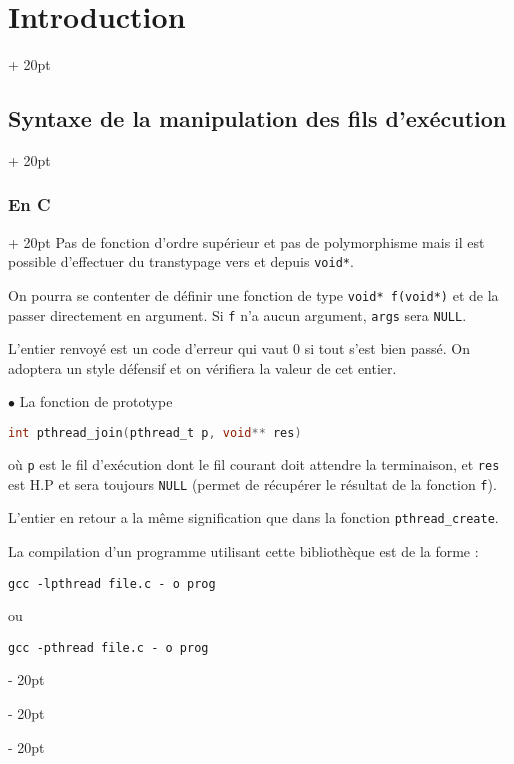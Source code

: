 \documentclass[a4paper, 12pt, twoside]{article}
\newcommand{\ind}[1][20pt]{\advance\leftskip + #1}
\newcommand{\deind}[1][20pt]{\advance\leftskip - #1}
\newenvironment{indt}[2][20pt]{#2 \par \ind[#1]}{\par \deind} %
\begin{document}
\begin{indt}{\section{Introduction}}
\begin{indt}{\subsection{Syntaxe de la manipulation des fils d'exécution}}
\begin{indt}{\subsubsection{En C}}
                Pas de fonction d'ordre supérieur et pas de polymorphisme mais il est possible d'effectuer du transtypage vers et depuis \texttt{void*}.

                On pourra se contenter de définir une fonction de type \texttt{void* f(void*)} et de la passer directement en argument.
                Si \texttt f n'a aucun argument, \texttt{args} sera \texttt{NULL}.

                L'entier renvoyé est un code d'erreur qui vaut 0 si tout s'est bien passé. On adoptera un style défensif et on vérifiera la valeur de cet entier.

                \vspace{12pt}
                
                $\bullet$ La fonction de prototype

                \begin{lstlisting}[language=C, xleftmargin=80pt]
int pthread_join(pthread_t p, void** res)\end{lstlisting}

                où \texttt p est le fil d'exécution dont le fil courant doit attendre la terminaison, et \texttt{res} est H.P et sera toujours \texttt{NULL} (permet de récupérer le résultat de la fonction \texttt f).

                L'entier en retour a la même signification que dans la fonction \texttt{pthread\_create}.

                \vspace{12pt}
                
                La compilation d'un programme utilisant cette bibliothèque est de la forme :

                \begin{center}
                    \texttt{gcc -lpthread file.c - o prog}
                \end{center}

                ou
                \begin{center}
                    \texttt{gcc -pthread file.c - o prog}
                \end{center}
            \end{indt}
        \end{indt}
    \end{indt}

    \vspace{12pt}
    
\end{document}
